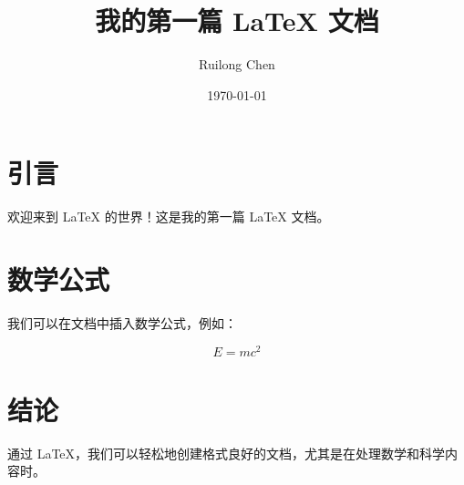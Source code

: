 \documentclass{article} %
\title{我的第一篇 LaTeX 文档} %
\author{Ruilong Chen} %
\date{\today} %
\begin{document}

\maketitle %

\section{引言} %
欢迎来到 LaTeX 的世界！这是我的第一篇 LaTeX 文档。

\section{数学公式} %
我们可以在文档中插入数学公式，例如：

\begin{equation} %
E = mc^2 %
\end{equation}

\section{结论} %
通过 LaTeX，我们可以轻松地创建格式良好的文档，尤其是在处理数学和科学内容时。
\end{document}
